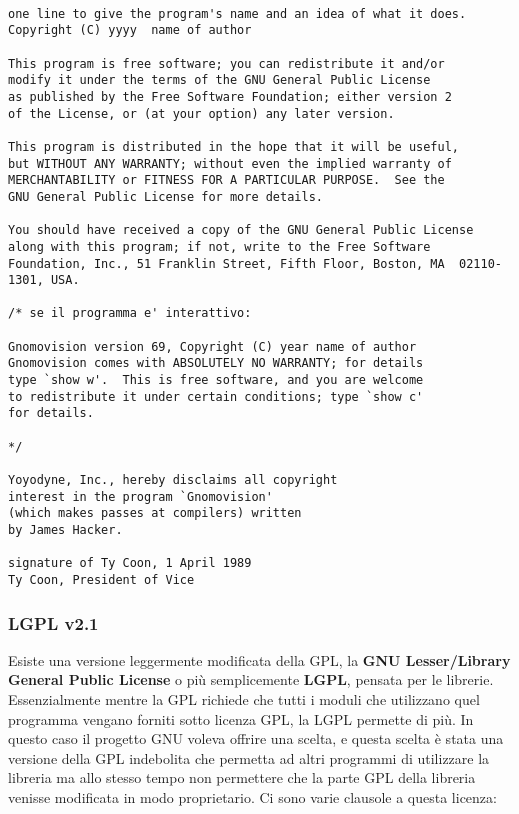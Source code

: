 \begin{lstlisting}[caption=Licenza GPLv2]

one line to give the program's name and an idea of what it does.
Copyright (C) yyyy  name of author

This program is free software; you can redistribute it and/or
modify it under the terms of the GNU General Public License
as published by the Free Software Foundation; either version 2
of the License, or (at your option) any later version.

This program is distributed in the hope that it will be useful,
but WITHOUT ANY WARRANTY; without even the implied warranty of
MERCHANTABILITY or FITNESS FOR A PARTICULAR PURPOSE.  See the
GNU General Public License for more details.

You should have received a copy of the GNU General Public License
along with this program; if not, write to the Free Software
Foundation, Inc., 51 Franklin Street, Fifth Floor, Boston, MA  02110-1301, USA.

/* se il programma e' interattivo:

Gnomovision version 69, Copyright (C) year name of author
Gnomovision comes with ABSOLUTELY NO WARRANTY; for details
type `show w'.  This is free software, and you are welcome
to redistribute it under certain conditions; type `show c' 
for details.

*/

Yoyodyne, Inc., hereby disclaims all copyright
interest in the program `Gnomovision'
(which makes passes at compilers) written 
by James Hacker.

signature of Ty Coon, 1 April 1989
Ty Coon, President of Vice

\end{lstlisting}

\subsubsection{LGPL v2.1}

Esiste una versione leggermente modificata della GPL, la \textbf{GNU Lesser/Library General Public License} o più semplicemente \textbf{LGPL}, pensata per le librerie. Essenzialmente mentre la GPL richiede che tutti i moduli che utilizzano quel programma vengano forniti sotto licenza GPL, la LGPL permette di più. In questo caso il progetto GNU voleva offrire una scelta, e questa scelta è stata una versione della GPL indebolita che permetta ad altri programmi di utilizzare la libreria ma allo stesso tempo non permettere che la parte GPL della libreria venisse modificata in modo proprietario. Ci sono varie clausole a questa licenza:

